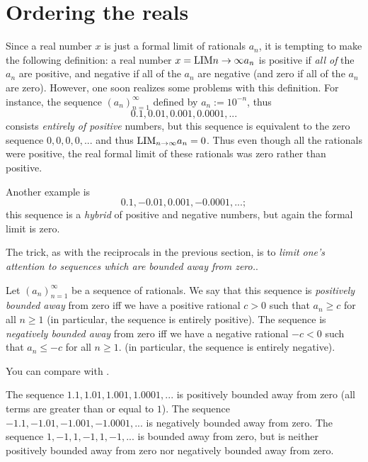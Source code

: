 \section{Ordering the reals} \label{sec 5.4}

Since a real number \(x\) is just a formal limit of rationals \(a_n\), it is tempting to make the following definition:
a real number \(x = \text{LIM}{n \to \infty} a_n\) is positive if \emph{all of} the \(a_n\) are positive,
and negative if all of the \(a_n\) are negative (and zero if all of the \(a_n\) are zero).
However, one soon realizes some problems with this definition. For instance, the sequence \((a_n)_{n = 1}^{\infty}\) defined by \(a_n := 10^{-n}\), thus
\[
    0.1, 0.01, 0.001, 0.0001,...
\]
consists \emph{entirely of positive} numbers, but this sequence is equivalent to the zero sequence \(0, 0, 0, 0,...\) and thus \(\text{LIM}_{n \to \infty} a_n = 0\).
Thus even though all the rationals were positive, the real formal limit of these rationals was zero rather than positive.

Another example is
\[
    0.1, -0.01, 0.001, -0.0001,...;
\]
this sequence is a \emph{hybrid} of positive and negative numbers, but again the formal limit is zero.

The trick, as with the reciprocals in the previous section, is to \emph{limit one’s attention to sequences which are bounded away from zero.}.

\begin{definition} \label{def 5.4.1}
Let \((a_n)_{n = 1}^{\infty}\) be a sequence of rationals.
We say that this sequence is \emph{positively bounded away} from zero iff we have a positive rational \(c > 0\) such that \(a_n \ge c\) for all \(n \ge 1\)
(in particular, the sequence is entirely positive).
The sequence is \emph{negatively bounded away} from zero iff we have a negative rational \(-c < 0\) such that \(a_n \le -c\) for all \(n \ge 1\).
(in particular, the sequence is entirely negative).
\end{definition}

\begin{note}
You can compare  with .
\end{note}

\begin{example} \label{example 5.4.2}
The sequence \(1.1, 1.01, 1.001, 1.0001,...\) is positively bounded away from zero (all terms are greater than or equal to \(1\)).
The sequence \(-1.1, -1.01, -1.001, -1.0001,...\) is negatively bounded away from zero.
The sequence \(1, -1, 1, -1, 1, -1,...\) is bounded away from zero, but is neither positively bounded away from zero nor negatively bounded away from zero.
\end{example}

